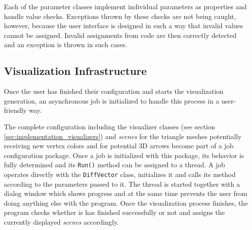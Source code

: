 
Each of the parameter classes implement individual parameters as properties and handle value checks. Exceptions thrown by these checks are not being caught, however, because the user interface is designed in such a way that invalid values cannot be assigned. Invalid assignments from code are then correctly detected and an exception is thrown in such cases.
\subsection{Visualization Infrastructure}

Once the user has finished their configuration and starts the visualization generation, an asynchronous job is initialized to handle this process in a user-friendly way.

The complete configuration including the visualizer classes (see section \ref{sec:implementation_visualizers}) and {\it scenes} for the triangle meshes potentially receiving new vertex colors and for potential 3D arrows become part of a job configuration package. Once a job is initialized with this package, its behavior is fully determined and its \verb+Run()+ method can be assigned to a thread. A job operates directly with the \verb+DiffVector+ class, initializes it and calls its method according to the parameters passed to it. The thread is started together with a dialog window which shows progress and at the same time prevents the user from doing anything else with the program. Once the visualization process finishes, the program checks whether is has finished successfully or not and assigns the currently displayed {\it scenes} accordingly.